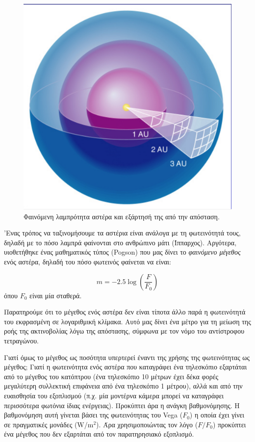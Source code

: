 \begin{figure}[h]
    \centering
    \includegraphics[scale=0.3]{Figures/flux.png}
    \caption{Φαινόμενη λαμπρότητα αστέρα και εξάρτησή της από την απόσταση.}
    \label{fig:flux}
\end{figure}

'Ενας τρόπος να ταξινομήσουμε τα αστέρια είναι ανάλογα με τη φωτεινότητά τους, δηλαδή με το πόσο λαμπρά φαίνονται στο ανθρώπινο μάτι (Ίππαρχος). Αργότερα, υιοθετήθηκε ένας μαθηματικός τύπος (Pogson) που μας δίνει το \textit{φαινόμενο μέγεθος} ενός αστέρα, δηλαδή του πόσο φωτεινός φαίνεται να είναι:

\begin{equation}
    \label{eq:apparent_magnitude}
    m = -2.5 \log \left ( \frac{F}{F_0} \right )
\end{equation}
όπου $F_0$ είναι μία σταθερά.

Παρατηρούμε ότι το μέγεθος ενός αστέρα δεν είναι τίποτα άλλο παρά η φωτεινότητά του εκφρασμένη σε λογαριθμική κλίμακα. Αυτό μας δίνει ένα μέτρο για τη μείωση της ροής της ακτινοβολίας λόγω της απόστασης, σύμφωνα με τον νόμο του αντίστροφου τετραγώνου.

Γιατί όμως το μέγεθος ως ποσότητα υπερτερεί έναντι της χρήσης της φωτεινότητας ως μέγεθος; Γιατί η φωτεινότητα ενός αστέρα που καταγράφει ένα τηλεσκόπιο εξαρτάται από το μέγεθος του κατόπτρου (ένα τηλεσκόπιο 10 μέτρων έχει δέκα φορές μεγαλύτερη συλλεκτική επιφάνεια από ένα τηλεσκόπιο 1 μέτρου), αλλά και από την ευαισθησία του εξοπλισμού (π.χ. μία μοντέρνα κάμερα μπορεί να καταγράφει περισσότερα φωτόνια ίδιας ενέργειας). Προκύπτει άρα η ανάγκη βαθμονόμησης. Η βαθμονόμηση αυτή γίνεται βάσει της φωτεινότητας του Vega ($F_0$) η οποία έχει γίνει σε πραγματικές μονάδες (W/$\text{m}^2$). Άρα χρησιμοποιώντας τον λόγο ($F/F_0$) προκύπτει ένα μέγεθος που δεν εξαρτάται από τον παρατηρησιακό εξοπλισμό.

